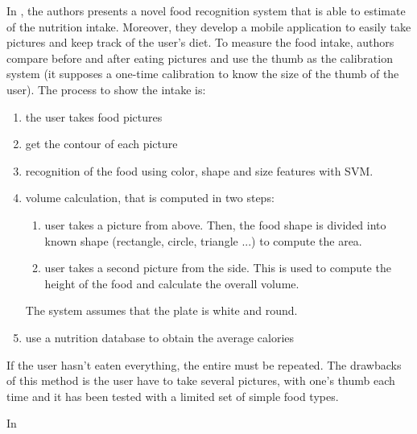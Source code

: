 In \cite{Almaghrabi2012a}, the authors presents a novel food recognition system that is able to estimate of the nutrition intake. Moreover, they develop a mobile application to easily take pictures and keep track of the user's diet.
To measure the food intake, authors compare before and after eating pictures and use the thumb as the calibration system (it supposes a one-time calibration to know the size of the thumb of the user).
The process to show the intake is:
\begin{enumerate}
    \item the user takes food pictures
    \item get the contour of each picture
    \item recognition of the food using color, shape and size features with SVM.
    \item volume calculation, that is computed in two steps:
    \begin{enumerate}
        \item user takes a picture from above. Then, the food shape is divided into known shape (rectangle, circle, triangle ...) to compute the area.
        \item user takes a second picture from the side. This is used to compute the height of the food and calculate the overall volume.
    \end{enumerate}
    The system assumes that the plate is white and round.
    \item use a nutrition database to obtain the average calories
\end{enumerate}
If the user hasn't eaten everything, the entire must be repeated.
The drawbacks of this method is the user have to take several pictures, with one's thumb each time and it has been tested with a limited set of simple food types.


In \cite{Kawano2014a}